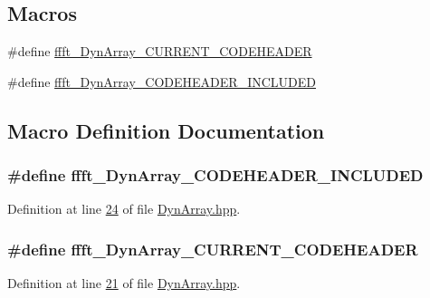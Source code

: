 \subsection*{Macros}
\begin{DoxyCompactItemize}
\item 
\#define \hyperlink{a00092_ad74efcb6a9d581885aa6775982c07997}{ffft\+\_\+\+Dyn\+Array\+\_\+\+C\+U\+R\+R\+E\+N\+T\+\_\+\+C\+O\+D\+E\+H\+E\+A\+D\+E\+R}
\item 
\#define \hyperlink{a00092_a86200f79a6a46453b3f096c370e0ae16}{ffft\+\_\+\+Dyn\+Array\+\_\+\+C\+O\+D\+E\+H\+E\+A\+D\+E\+R\+\_\+\+I\+N\+C\+L\+U\+D\+E\+D}
\end{DoxyCompactItemize}


\subsection{Macro Definition Documentation}
\hypertarget{a00092_a86200f79a6a46453b3f096c370e0ae16}{
\subsubsection[{ffft\+\_\+\+Dyn\+Array\+\_\+\+C\+O\+D\+E\+H\+E\+A\+D\+E\+R\+\_\+\+I\+N\+C\+L\+U\+D\+E\+D}]{\setlength{\rightskip}{0pt plus 5cm}\#define ffft\+\_\+\+Dyn\+Array\+\_\+\+C\+O\+D\+E\+H\+E\+A\+D\+E\+R\+\_\+\+I\+N\+C\+L\+U\+D\+E\+D}}\label{a00092_a86200f79a6a46453b3f096c370e0ae16}


Definition at line \hyperlink{a00092_source_l00024}{24} of file \hyperlink{a00092_source}{Dyn\+Array.\+hpp}.

\hypertarget{a00092_ad74efcb6a9d581885aa6775982c07997}{
\subsubsection[{ffft\+\_\+\+Dyn\+Array\+\_\+\+C\+U\+R\+R\+E\+N\+T\+\_\+\+C\+O\+D\+E\+H\+E\+A\+D\+E\+R}]{\setlength{\rightskip}{0pt plus 5cm}\#define ffft\+\_\+\+Dyn\+Array\+\_\+\+C\+U\+R\+R\+E\+N\+T\+\_\+\+C\+O\+D\+E\+H\+E\+A\+D\+E\+R}}\label{a00092_ad74efcb6a9d581885aa6775982c07997}


Definition at line \hyperlink{a00092_source_l00021}{21} of file \hyperlink{a00092_source}{Dyn\+Array.\+hpp}.

